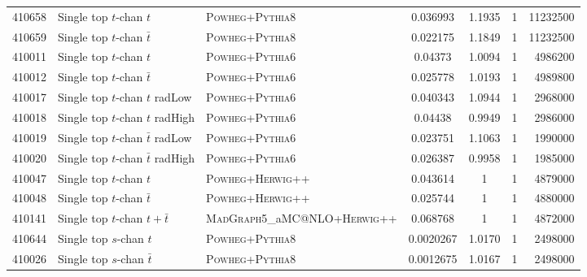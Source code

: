 \begin{table}[hb]
{\begin{tabular}{rllS[table-format=3.2]S[table-format=3.2]rr}
      410658 & Single top $t$-chan $t$ & \textsc{Powheg}+\textsc{Pythia}8 & 0.036993 & 1.1935 & 1 & 11232500 \\
      410659 & Single top $t$-chan $\bar{t}$ & \textsc{Powheg}+\textsc{Pythia}8 & 0.022175 & 1.1849 & 1 & 11232500 \\
      
      410011 & Single top $t$-chan $t$ & \textsc{Powheg}+\textsc{Pythia}6 & 0.04373 & 1.0094 & 1 & 4986200 \\
      410012 & Single top $t$-chan $\bar{t}$ & \textsc{Powheg}+\textsc{Pythia}6 & 0.025778 & 1.0193 & 1 & 4989800 \\
      410017 & Single top $t$-chan $t$ radLow & \textsc{Powheg}+\textsc{Pythia}6 & 0.040343 & 1.0944 & 1 & 2968000\\
      410018 & Single top $t$-chan $t$ radHigh & \textsc{Powheg}+\textsc{Pythia}6 & 0.04438 & 0.9949 & 1 & 2986000\\
      410019 & Single top $t$-chan $\bar{t}$ radLow & \textsc{Powheg}+\textsc{Pythia}6 & 0.023751 & 1.1063 & 1 & 1990000\\
      410020 & Single top $t$-chan $\bar{t}$ radHigh & \textsc{Powheg}+\textsc{Pythia}6 & 0.026387 & 0.9958 & 1 & 1985000\\
      410047 & Single top $t$-chan $t$ & \textsc{Powheg}+\textsc{Herwig}++ & 0.043614  & 1 & 1 & 4879000\\
      410048 & Single top $t$-chan $\bar{t}$ & \textsc{Powheg}+\textsc{Herwig}++ &  0.025744 & 1 & 1 & 4880000 \\
      410141 & Single top $t$-chan $t+\bar{t}$ & \textsc{MadGraph}5\_aMC@NLO+\textsc{Herwig}++ &  0.068768  & 1 & 1 & 4872000 \\
      
      410644 & Single top $s$-chan $t$ & \textsc{Powheg}+\textsc{Pythia}8 & 0.0020267 & 1.0170 & 1 &  2498000\\
      410026 & Single top $s$-chan $\bar{t}$ & \textsc{Powheg}+\textsc{Pythia}8 & 0.0012675 & 1.0167 & 1 &  2498000\\
      

\end{tabular}}
\end{table}
